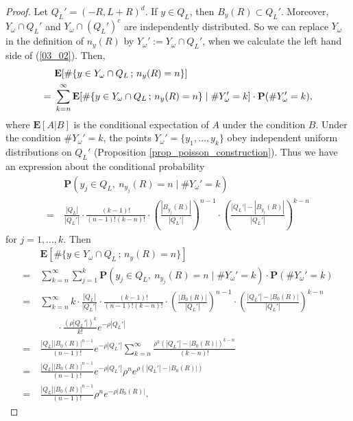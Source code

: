 \documentclass[12pt,a4paper]{article}
\begin{document}
\begin{proof}
Let $Q_L'=(-R,L+R)^d$.
If $y\in Q_L$, then $B_y(R)\subset Q_L'$.
Moreover, $Y_\omega \cap Q_L'$
and $Y_\omega\cap (Q_L')^c$ are independently distributed.
So we can replace $Y_\omega$ in the definition of
$n_y(R)$ by $Y_\omega':=Y_\omega \cap Q_L'$,
when we calculate the left hand side of (\ref{03_02}).
Then,
\begin{align*}
&\  \mathbf{E}[
\#\{y\in Y_\omega\cap Q_L \,;\, n_y(R)=n\}
]\notag\\
=&\ 
\sum_{k=n}^\infty \mathbf{E}[
\#\{y\in Y_\omega \cap Q_L \,;\, n_y(R)=n\}
\mid \#Y_\omega'=k
]
\cdot 
\mathbf{P}(\#Y_\omega'=k),
\end{align*}
where $\mathbf{E}[A|B]$ is the conditional expectation of $A$
under the condition $B$.
Under the condition $\#Y_\omega'=k$,
the points $Y_\omega'=\{y_1,\ldots,y_k\}$ obey
independent uniform distributions on $Q_L'$
(Proposition \ref{prop_poisson_construction}).
Thus we have an expression about
the conditional probability
\begin{align*}
&\  \mathbf{P}(y_j \in Q_L,\ n_{y_j}(R)=n \mid \# Y_\omega'=k)\\
=&\ 
\frac{|Q_L|}{|Q_L'|}
\cdot
\frac{(k-1)!}{(n-1)!(k-n)!}
\cdot
\left(\frac{|B_{y_j}(R)|}{|Q_L'|}\right)^{n-1}
\cdot
\left(\frac{|Q_L'|-|B_{y_j}(R)|}{|Q_L'|}\right)^{k-n}
\end{align*}
for $j=1,\ldots, k$.
Then
\begin{align*}
&\  \mathbf{E}[\#\{y\in Y_\omega \cap Q_L\,;\, n_y(R)=n\}]\\
=&\ 
\sum_{k=n}^\infty
\sum_{j=1}^k \mathbf{P}(y_j \in Q_L,\ n_{y_j}(R)=n \mid \# Y_\omega'=k)
\cdot 
\mathbf{P}(\# Y_\omega'=k)\\
=&\ 
\sum_{k=n}^\infty
k\cdot
\frac{|Q_L|}{|Q_L'|}
\cdot
\frac{(k-1)!}{(n-1)!(k-n)!}
\cdot
\left(\frac{|B_{0}(R)|}{|Q_L'|}\right)^{n-1}
\cdot
\left(\frac{|Q_L'|-|B_{0}(R)|}{|Q_L'|}\right)^{k-n}\\
&\qquad
\cdot
\frac{(\rho |Q_L'|)^k}{k!}e^{-\rho|Q_L'|}\\
=&\ 
\frac{|Q_L||B_0(R)|^{n-1}}{(n-1)!}e^{-\rho|Q_L'|}
\sum_{k=n}^\infty \frac{\rho^k(|Q_L'|-|B_0(R)|)^{k-n}}{(k-n)!}\\
=&\ 
\frac{|Q_L||B_0(R)|^{n-1}}{(n-1)!}e^{-\rho|Q_L'|}\rho^n
e^{\rho(|Q_L'|-|B_0(R)|)}\\
=&\ 
\frac{|Q_L||B_0(R)|^{n-1}}{(n-1)!}\rho^n
e^{-\rho|B_0(R)|}.
\end{align*}
\end{proof}
\end{document}
